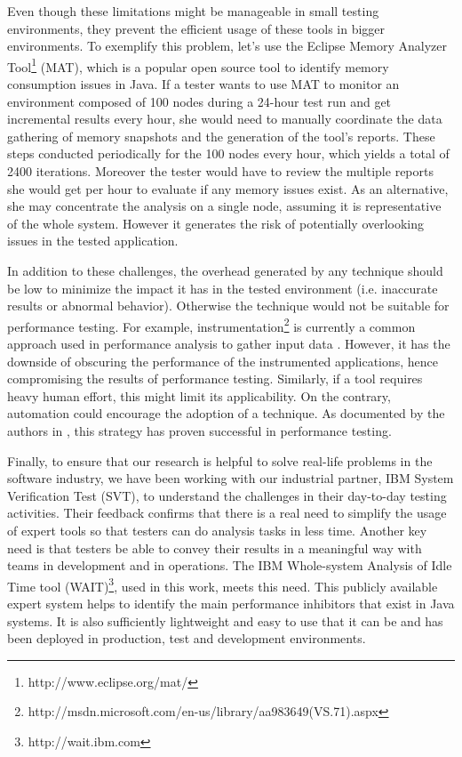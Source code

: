 \documentclass[runningheads,a4paper]{llncs}
\begin{document}
Even though these limitations might be manageable in small testing environments,
they prevent the efficient usage of these tools in bigger environments. To
exemplify this problem, let's use the Eclipse Memory Analyzer
Tool\footnote{http://www.eclipse.org/mat/} (MAT), which is a popular open source
tool to identify memory consumption issues in Java. If a tester wants to use MAT
to monitor an environment composed of 100 nodes during a 24-hour test run and 
get incremental results every hour, she would need to manually coordinate the
data gathering of memory snapshots and the generation of the tool's reports.
These steps conducted periodically for the 100 nodes every hour, which
yields a total of 2400 iterations. Moreover the tester would have to review
the multiple reports she would get per hour to evaluate if any memory issues
exist. As an alternative, she may concentrate the analysis on a single node,
assuming it is representative of the whole system. However it generates the risk of
potentially overlooking issues in the tested application.

In addition to these challenges, the overhead generated by any technique
should be low to minimize the impact it has in the
tested environment (i.e. inaccurate results or abnormal behavior). Otherwise the
technique would not be suitable for performance testing. For example,
instrumentation\footnote{http://msdn.microsoft.com/en-us/library/aa983649(VS.71).aspx}
is currently a common approach used in performance analysis to gather input data
\cite{Yang1,Hangal1,Csallner1,Chen2}. However, it has the downside of obscuring
the performance of the instrumented applications, hence compromising the results of 
performance testing. Similarly, if a tool requires heavy human effort, this might limit its 
applicability. On the contrary, automation could encourage the adoption of a technique. 
As documented by the authors in \cite{Shahamiri1}, this strategy has proven
successful in performance testing.

Finally, to ensure that our research is helpful to solve real-life
problems in the software industry, we have been working with our industrial
partner, IBM System Verification Test (SVT), to understand the challenges
in their day-to-day testing activities. Their feedback confirms that there is a 
real need to simplify the usage of expert tools so that testers can do
analysis tasks in less time. Another key need is that testers be able to convey
their results in a meaningful way with teams in development and in operations.
The IBM Whole-system Analysis of Idle Time tool (WAIT)\footnote{http://wait.ibm.com},
used in this work, meets this need. This publicly available expert system
helps to identify the main performance inhibitors that exist in Java
systems. It is also sufficiently lightweight and easy to use that it can be and
has been deployed in production, test and development environments.
\end{document}
